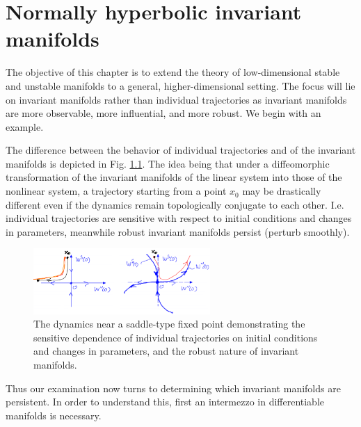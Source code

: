 \chapter{Normally hyperbolic invariant manifolds}
The objective of this chapter is to extend the theory of low-dimensional stable and unstable manifolds to a general, higher-dimensional setting. The focus will lie on invariant manifolds rather than individual trajectories as invariant manifolds are more observable, more influential, and more robust. We begin with an example.

\begin{ex}
	The difference between the behavior of individual trajectories and of the invariant manifolds is depicted in Fig. \ref{fig:individual_trajectory}. The idea being that under a diffeomorphic transformation of the invariant manifolds of the linear system into those of the nonlinear system, a trajectory starting from a point $x_0$ may be drastically different even if the dynamics remain topologically conjugate to each other. I.e. individual trajectories are sensitive with respect to initial conditions and changes in parameters, meanwhile robust invariant manifolds persist (perturb smoothly).
	\begin{figure}[h!]
		\centering
		\includegraphics[width=0.6\textwidth]{figures/ch9/1individual_trajectory.png}
		\caption{The dynamics near a saddle-type fixed point demonstrating the sensitive dependence of individual trajectories on initial conditions and changes in parameters, and the robust nature of invariant manifolds.}
		\label{fig:individual_trajectory}
	\end{figure}
\end{ex}

Thus our examination now turns to determining which invariant manifolds are persistent. In order to understand this, first an intermezzo in differentiable manifolds is necessary.

